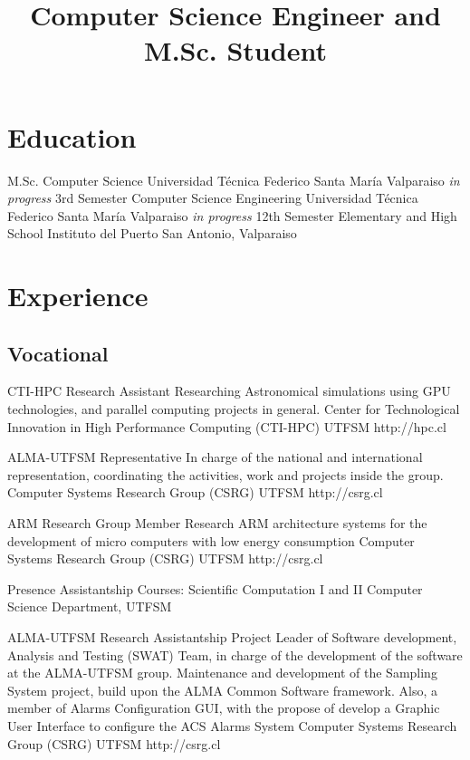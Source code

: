 \documentclass[11pt,a4paper]{moderncv}
\title{\large Computer Science Engineer and M.Sc. Student}               %
\begin{document}
\maketitle

\section{Education}
	{M.Sc. Computer Science}
	{Universidad Técnica Federico Santa María}
	{Valparaiso}
	{\emph{in progress}}
	{3rd Semester}
	{Computer Science Engineering}
	{Universidad Técnica Federico Santa María}
	{Valparaiso}
	{\emph{in progress}}
	{12th Semester}
	{Elementary and High School}
	{Instituto del Puerto}
	{San Antonio, Valparaiso}
	{}{}

\vspace{-0.5cm}
\section{Experience}
\subsection{Vocational}

    {CTI-HPC Research Assistant}
    {Researching Astronomical simulations using GPU technologies, and parallel computing projects in general.}
    {Center for Technological Innovation in High Performance Computing (CTI-HPC)}
    {UTFSM}
    {http://hpc.cl}

	{ALMA-UTFSM Representative}
	{In charge of the national and international representation, coordinating the activities, work and projects inside the group.}
	{Computer Systems Research Group (CSRG)}
	{UTFSM}
	{http://csrg.cl}

	{ARM Research Group Member}
	{Research ARM architecture systems for the development of micro computers with low energy consumption}
	{Computer Systems Research Group (CSRG)}
	{UTFSM}
	{http://csrg.cl}

	{Presence Assistantship}
	{Courses: Scientific Computation I and II}
	{Computer Science Department, UTFSM}
	{}{}

	{ALMA-UTFSM Research Assistantship}
	{Project Leader of Software development, Analysis and Testing (SWAT) Team, in charge of the development of the software at the ALMA-UTFSM group. 
	Maintenance and development of the Sampling System project, build upon the ALMA Common Software framework.
	Also, a member of Alarms Configuration GUI, with the propose of develop a Graphic User Interface to configure the ACS Alarms System}
	{Computer Systems Research Group (CSRG)}
	{UTFSM}
	{http://csrg.cl}
\end{document}
